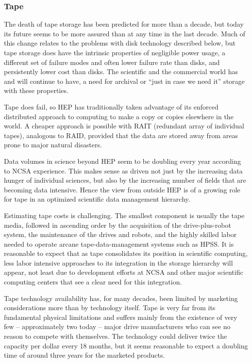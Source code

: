 \subsubsection{Tape}
The death of tape storage has been predicted for more than a decade, but today 
its future seems to be more assured than at any time in the last decade.  
Much of this change relates to the problems with disk technology described 
below, but tape storage does have the intrinsic properties of negligible 
power usage, a different set of failure modes and often lower failure rate 
than disks, and persistently lower cost than disks.  The scientific and the 
commercial world has and will continue to have, a need for archival or ``just 
in case we need it'' storage with these properties.

Tape does fail, so HEP has traditionally taken advantage of its enforced distributed 
approach to computing to make a copy or copies elsewhere in the world.  A cheaper 
approach is possible with RAIT (redundant array of individual tapes), analogous 
to RAID, provided that the data are stored away from areas prone to major natural
disasters.

Data volumes in science beyond HEP seem to be doubling every year according to NCSA 
experience.  This makes sense as driven not just by the increasing data hunger of 
individual sciences, but also by the increasing number of fields that are becoming 
data intensive.  Hence the view from outside HEP is of a growing role for tape in an 
optimized scientific data management hierarchy.

Estimating tape costs is challenging.  The smallest component is usually the tape 
media, followed in ascending order by the acquisition of the drive-plus-robot system, 
the maintenance of the drives and robots, and the highly skilled labor needed to 
operate arcane tape-data-management systems such as HPSS.  It is reasonable to 
expect that as tape consolidates its position in scientific computing, less 
labor intensive approaches to its integration in the storage hierarchy will appear, 
not least due to development efforts at NCSA and other major scientific computing 
centers that see a clear need for this integration.

Tape technology availability has, for many decades, been limited by marketing considerations 
more than by technology itself.  Tape is very far from its fundamental physical 
limitations and suffers mainly from the existence of very few -- approximately 
two today -- major drive manufacturers who can see no reason to compete with 
themselves.  The technology could deliver twice the capacity per dollar every 
18 months, but it seems reasonable to expect a doubling time of around three 
years for the marketed products.


